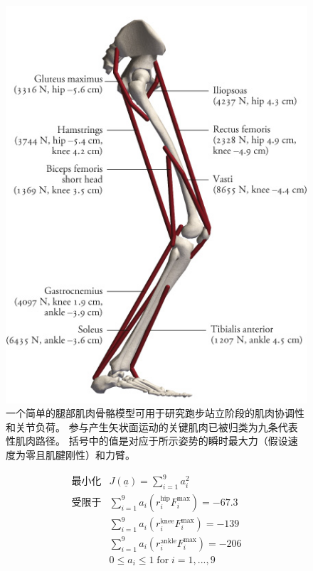 \begin{figure}[!htb]
	\centering
	\includegraphics[width=0.7\linewidth]{chap9/9_9}
	\caption{一个简单的腿部肌肉骨骼模型可用于研究跑步站立阶段的肌肉协调性和关节负荷。
		参与产生矢状面运动的关键肌肉已被归类为九条代表性肌肉路径\cite{hamner2013muscle}。
		括号中的值是对应于所示姿势的瞬时最大力（假设速度为零且肌腱刚性）和力臂。 \label{fig:9_9}}
\end{figure}


\begin{proposition}
	
	\begin{equation}
		\begin{aligned}
			\text{最小化} & J(\underline{a}) = \sum_{i=1}^{9} a_i ^2  \\
			\text{受限于} & \sum_{i=1}^{9} a_i ( r_i^\text{hip} F_i^\text{max} ) = -67.3 \\
			& \sum_{i=1}^{9} a_i ( r_i^\text{knee} F_i^\text{max} ) = -139 \\
			& \sum_{i=1}^{9} a_i ( r_i^\text{ankle} F_i^\text{max} ) = -206 \\
			& 0 \leq a_i \leq 1 \; \text{for} \; i=1,...,9
			\nonumber
		\end{aligned}
	\end{equation}
	
\end{proposition}

